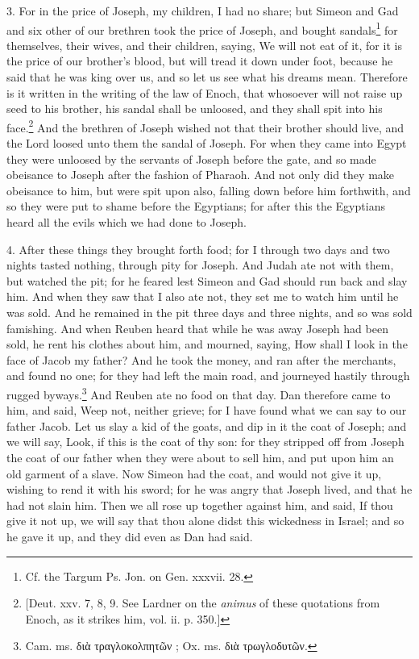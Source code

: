 3. For in the price of Joseph, my children, I had no share; but Simeon and Gad and six other of our brethren took the price of Joseph, and bought sandals\footnote{Cf. the Targum Ps. Jon. on Gen. xxxvii. 28.} for themselves, their wives, and their children, saying, We will not eat of it, for it is the price of our brother’s blood, but will tread it down under foot, because he said that he was king over us, and so let us see what his dreams mean. Therefore is it written in the writing of the law of Enoch, that whosoever will not raise up seed to his brother, his sandal shall be unloosed, and they shall spit into his face.\footnote{[Deut. xxv. 7, 8, 9. See Lardner on the \emph{animus} of these quotations from Enoch, as it strikes him, vol. ii. p. 350.]} And the brethren of Joseph wished not that their brother should live, and the Lord loosed unto them the sandal of Joseph. For when they came into Egypt they were unloosed by the servants of Joseph before the gate, and so made obeisance to Joseph after the fashion of Pharaoh. And not only did they make obeisance to him, but were spit upon also, falling down before him forthwith, and so they were put to shame before the Egyptians; for after this the Egyptians heard all the evils which we had done to Joseph.

4. After these things they brought forth food; for I through two days and two nights tasted nothing, through pity for Joseph. And Judah ate not with them, but watched the pit; for he feared lest Simeon and Gad should run back and slay him. And when they saw that I also ate not, they set me to watch him until he was sold. And he remained in the pit three days and three nights, and so was sold famishing. And when Reuben heard that while he was away Joseph had been sold, he rent his clothes about him, and mourned, saying, How shall I look in the face of Jacob my father? And he took the money, and ran after the merchants, and found no one; for they had left the main road, and journeyed hastily through rugged byways.\footnote{Cam. ms. \textgreek{διὰ τραγλοκολπητῶν} ; Ox. ms. \textgreek{διὰ τρωγλοδυτῶν}.} And Reuben ate no food on that day. Dan therefore came to him, and said, Weep not, neither grieve; for I have found what we can say to our father Jacob. Let us slay a kid of the goats, and dip in it the coat of Joseph; and we will say, Look, if this is the coat of thy son: for they stripped off from Joseph the coat of our father when they were about to sell him, and put upon him an old garment of a slave. Now Simeon had the coat, and would not give it up, wishing to rend it with his sword; for he was angry that Joseph lived, and that he had not slain him. Then we all rose up together against him, and said, If thou give it not up, we will say that thou alone didst this wickedness in Israel; and so he gave it up, and they did even as Dan had said.

